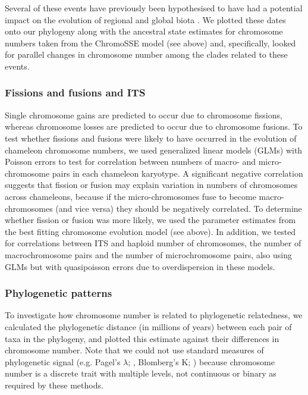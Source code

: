 \documentclass[a4paper, 12pt]{article}
\begin{document}
Several of these events have previously been hypothesised to have had a potential impact on the evolution of regional and global biota \citep[e.g.][]{zhou2012out,samonds2013imperfect,buerki2013abrupt,godfrey2020mid}.
We plotted these dates onto our phylogeny along with the ancestral state estimates for chromosome numbers taken from the ChromoSSE model (see above) and, specifically, looked for parallel changes in chromosome number among the clades related to these events.

\subsubsection{Fissions and fusions and ITS}
Single chromosome gains are predicted to occur due to chromosome fissions, whereas chromosome losses are predicted to occur due to chromosome fusions. 
To test whether fissions and fusions were likely to have occurred in the evolution of chameleon chromosome numbers, we used generalized linear models (GLMs) with Poisson errors to test for correlation between numbers of macro- and micro-chromosome pairs in each chameleon karyotype. 
A significant negative correlation suggests that fission or fusion may explain variation in numbers of chromosomes across chameleons, because if the micro-chromosomes fuse to become macro-chromosomes (and vice versa) they should be negatively correlated.
To determine whether fission or fusion was more likely, we used the parameter estimates from the best fitting chromosome evolution model (see above). 
In addition, we tested for correlations between ITS and haploid number of chromosomes, the number of macrochromosome pairs and the number of microchromosome pairs, also using GLMs but with quasipoisson errors due to overdispersion in these models.

\subsubsection{Phylogenetic patterns}
To investigate how chromosome number is related to phylogenetic relatedness, we calculated the phylogenetic distance (in millions of years) between each pair of taxa in the phylogeny, and plotted this estimate against their differences in chromosome number. 
Note that we could not use standard measures of phylogenetic signal (e.g. Pagel's $\lambda$; \citealt{pagel1999inferring}, Blomberg's K; \citealt{blomberg2003testing}) because chromosome number is a discrete trait with multiple levels, not continuous or binary as required by these methods. 
\end{document}
